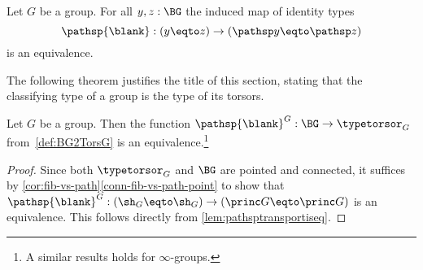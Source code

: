 \begin{lemma}\label{lem:pathsptransportiseq}
  Let $G$ be a group. For all $y,z:\BG$ the induced map of identity types
  \[
    \pathsp{\blank}:(y\eqto z)\to (\pathsp y\eqto \pathsp z)
  \]
  is an equivalence.
\end{lemma}

The following theorem justifies the title of this section, stating 
that the classifying type of a group is the type of its torsors.

\begin{theorem}\label{lem:BGbytorsor}
  Let $G$ be a group. Then the function
  $\pathsp{\blank}^G:\BG\to\typetorsor_G$ from~\cref{def:BG2TorsG}
  is an equivalence.\footnote{A similar results holds for $\infty$-groups.}
\end{theorem}

\begin{proof}
  Since both $\typetorsor_G$ and $\BG$ are pointed and connected,
  it suffices by
  \cref{cor:fib-vs-path}\ref{conn-fib-vs-path-point} to show that 
  $\pathsp{\blank}^G:(\sh_G\eqto\sh_G)\to(\princ G\eqto \princ G)$
  is an equivalence.
  This follows directly from \cref{lem:pathsptransportiseq}.
\end{proof}

